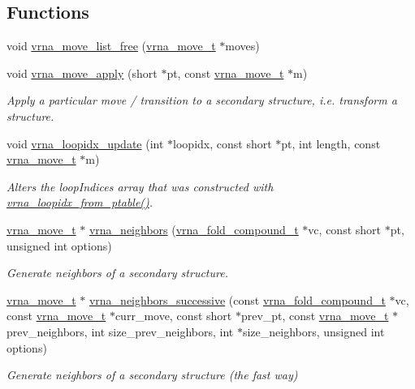 \subsection*{Functions}
\begin{DoxyCompactItemize}
\item 
void \hyperlink{group__neighbors_gad085062ae3aa7ee20783debe4a906fad}{vrna\+\_\+move\+\_\+list\+\_\+free} (\hyperlink{group__neighbors_structvrna__move__s}{vrna\+\_\+move\+\_\+t} $\ast$moves)
\item 
void \hyperlink{group__neighbors_gacdbc5f609b46aeb07d2c7e015677a1e0}{vrna\+\_\+move\+\_\+apply} (short $\ast$pt, const \hyperlink{group__neighbors_structvrna__move__s}{vrna\+\_\+move\+\_\+t} $\ast$m)
\begin{DoxyCompactList}\small\item\em Apply a particular move / transition to a secondary structure, i.\+e. transform a structure. \end{DoxyCompactList}\item 
void \hyperlink{group__neighbors_ga5ceb55ee56494b1f5b7aaa758cb722d1}{vrna\+\_\+loopidx\+\_\+update} (int $\ast$loopidx, const short $\ast$pt, int length, const \hyperlink{group__neighbors_structvrna__move__s}{vrna\+\_\+move\+\_\+t} $\ast$m)
\begin{DoxyCompactList}\small\item\em Alters the loop\+Indices array that was constructed with \hyperlink{group__struct__utils_ga03e15af299be0866ff21da880c74b92e}{vrna\+\_\+loopidx\+\_\+from\+\_\+ptable()}. \end{DoxyCompactList}\item 
\hyperlink{group__neighbors_structvrna__move__s}{vrna\+\_\+move\+\_\+t} $\ast$ \hyperlink{group__neighbors_ga249544953933c64a6a5a20b33e3d3bc9}{vrna\+\_\+neighbors} (\hyperlink{group__fold__compound_ga1b0cef17fd40466cef5968eaeeff6166}{vrna\+\_\+fold\+\_\+compound\+\_\+t} $\ast$vc, const short $\ast$pt, unsigned int options)
\begin{DoxyCompactList}\small\item\em Generate neighbors of a secondary structure. \end{DoxyCompactList}\item 
\hyperlink{group__neighbors_structvrna__move__s}{vrna\+\_\+move\+\_\+t} $\ast$ \hyperlink{group__neighbors_gae5aaa1c5a1f22e889843f3edbdd04714}{vrna\+\_\+neighbors\+\_\+successive} (const \hyperlink{group__fold__compound_ga1b0cef17fd40466cef5968eaeeff6166}{vrna\+\_\+fold\+\_\+compound\+\_\+t} $\ast$vc, const \hyperlink{group__neighbors_structvrna__move__s}{vrna\+\_\+move\+\_\+t} $\ast$curr\+\_\+move, const short $\ast$prev\+\_\+pt, const \hyperlink{group__neighbors_structvrna__move__s}{vrna\+\_\+move\+\_\+t} $\ast$prev\+\_\+neighbors, int size\+\_\+prev\+\_\+neighbors, int $\ast$size\+\_\+neighbors, unsigned int options)
\begin{DoxyCompactList}\small\item\em Generate neighbors of a secondary structure (the fast way) \end{DoxyCompactList}\end{DoxyCompactItemize}


